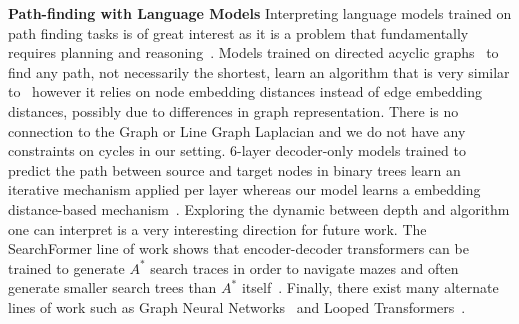 {\bf Path-finding with Language Models} 
Interpreting language models trained on path finding tasks is of great interest as it is a problem that fundamentally requires planning and reasoning~\cite{wang2024}. Models trained on directed acyclic graphs~\cite{khona2024towards} to find any path, not necessarily the shortest, learn an algorithm that is very similar to \ours\ however it relies on node embedding distances instead of edge embedding distances, possibly due to differences in graph representation. There is no connection to the Graph or Line Graph Laplacian and we do not have any constraints on cycles in our setting.
6-layer decoder-only models trained to predict the path between source and target nodes in binary trees learn an iterative mechanism applied per layer whereas our model learns a embedding distance-based mechanism~\cite{brinkmann2024}. Exploring the dynamic between depth and algorithm one can interpret is a very interesting direction for future work.
The SearchFormer line of work shows that encoder-decoder transformers can be trained to generate $A^*$ search traces in order to navigate mazes and often generate smaller search trees than $A^*$ itself~\cite{lehnert2024beyondastar, su2024dualformer}. %
Finally, there exist many alternate lines of work such as Graph Neural Networks~\cite{wu2021gnn} and Looped Transformers~\cite{deluca2024}.

\vspace{-0.1in}